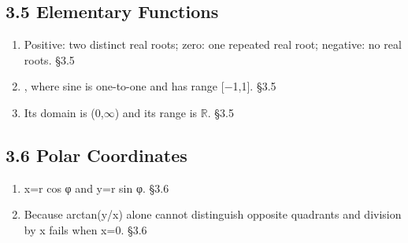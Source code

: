 \documentclass[11pt]{article}
\begin{document}
\begin{keepsection}\subsection{3.5 Elementary Functions}

\begin{enumerate}
\item Positive: two distinct real roots; zero: one repeated real root; negative: no real roots. \hfill{\small\color{FAUblue}§3.5}
\item [\ensuremath{-}{\small\ensuremath{\dfrac{π}{2}}},{\small\ensuremath{\dfrac{π}{2}}}], where sine is one-to-one and has range [\ensuremath{-}1,1]. \hfill{\small\color{FAUblue}§3.5}
\item Its domain is (0,\ensuremath{\infty}) and its range is \ensuremath{\mathbb{R}}. \hfill{\small\color{FAUblue}§3.5}
\end{enumerate}

\end{keepsection}
\begin{keepsection}\subsection{3.6 Polar Coordinates}

\begin{enumerate}
\item x=r cos φ and y=r sin φ. \hfill{\small\color{FAUblue}§3.6}
\item Because arctan(y/x) alone cannot distinguish opposite quadrants and division by x fails when x=0. \hfill{\small\color{FAUblue}§3.6}
\end{enumerate}

\end{keepsection}
\end{document}
